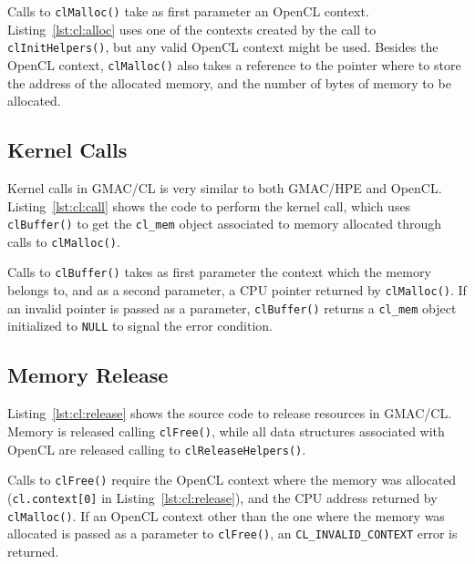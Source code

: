 

Calls to \texttt{clMalloc()} take as first parameter an OpenCL context.  Listing~\ref{lst:cl:alloc} 
uses one of the contexts created by the call to \texttt{clInitHelpers()}, but any valid OpenCL 
context might be used. Besides the OpenCL context, \texttt{clMalloc()} also takes a reference to the 
pointer where to store the address of the allocated memory, and the number of bytes of memory to be 
allocated.

\subsection{Kernel Calls}
Kernel calls in GMAC\slash CL is very similar to both GMAC\slash HPE and OpenCL\@.  
Listing~\ref{lst:cl:call} shows the code to perform the kernel call, which uses 
\texttt{clBuffer()} to get the \texttt{cl\_mem} object associated to memory allocated through calls 
to \texttt{clMalloc()}.



Calls to \texttt{clBuffer()} takes as first parameter the context which the memory belongs to, and 
as a second parameter, a CPU pointer returned by \texttt{clMalloc()}.  If an invalid pointer is 
passed as a parameter, \texttt{clBuffer()} returns a \texttt{cl\_mem} object initialized to 
\texttt{NULL} to signal the error condition.

\subsection{Memory Release}
Listing~\ref{lst:cl:release} shows the source code to release resources in GMAC\slash CL\@. Memory 
is released calling \texttt{clFree()}, while all data structures associated with OpenCL are released 
calling to \texttt{clReleaseHelpers()}.



Calls to \texttt{clFree()} require the OpenCL context where the memory was allocated 
(\texttt{cl.context[0]} in Listing~\ref{lst:cl:release}), and the CPU address returned by 
\texttt{clMalloc()}. If an OpenCL context other than the one where the memory was allocated is 
passed as a parameter to \texttt{clFree()}, an \texttt{CL\_INVALID\_CONTEXT} error is returned.

